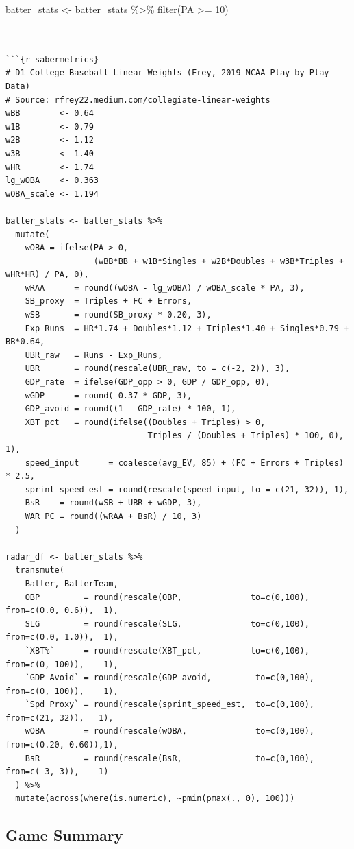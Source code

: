 \documentclass[
]{article}
\begin{document}
batter\_stats \textless- batter\_stats \%\textgreater\% filter(PA
\textgreater= 10)

\begin{verbatim}


```{r sabermetrics}
# D1 College Baseball Linear Weights (Frey, 2019 NCAA Play-by-Play Data)
# Source: rfrey22.medium.com/collegiate-linear-weights
wBB        <- 0.64
w1B        <- 0.79
w2B        <- 1.12
w3B        <- 1.40
wHR        <- 1.74
lg_wOBA    <- 0.363
wOBA_scale <- 1.194

batter_stats <- batter_stats %>%
  mutate(
    wOBA = ifelse(PA > 0,
                  (wBB*BB + w1B*Singles + w2B*Doubles + w3B*Triples + wHR*HR) / PA, 0),
    wRAA      = round((wOBA - lg_wOBA) / wOBA_scale * PA, 3),
    SB_proxy  = Triples + FC + Errors,
    wSB       = round(SB_proxy * 0.20, 3),
    Exp_Runs  = HR*1.74 + Doubles*1.12 + Triples*1.40 + Singles*0.79 + BB*0.64,
    UBR_raw   = Runs - Exp_Runs,
    UBR       = round(rescale(UBR_raw, to = c(-2, 2)), 3),
    GDP_rate  = ifelse(GDP_opp > 0, GDP / GDP_opp, 0),
    wGDP      = round(-0.37 * GDP, 3),
    GDP_avoid = round((1 - GDP_rate) * 100, 1),
    XBT_pct   = round(ifelse((Doubles + Triples) > 0,
                             Triples / (Doubles + Triples) * 100, 0), 1),
    speed_input      = coalesce(avg_EV, 85) + (FC + Errors + Triples) * 2.5,
    sprint_speed_est = round(rescale(speed_input, to = c(21, 32)), 1),
    BsR    = round(wSB + UBR + wGDP, 3),
    WAR_PC = round((wRAA + BsR) / 10, 3)
  )

radar_df <- batter_stats %>%
  transmute(
    Batter, BatterTeam,
    OBP         = round(rescale(OBP,              to=c(0,100), from=c(0.0, 0.6)),  1),
    SLG         = round(rescale(SLG,              to=c(0,100), from=c(0.0, 1.0)),  1),
    `XBT%`      = round(rescale(XBT_pct,          to=c(0,100), from=c(0, 100)),    1),
    `GDP Avoid` = round(rescale(GDP_avoid,         to=c(0,100), from=c(0, 100)),    1),
    `Spd Proxy` = round(rescale(sprint_speed_est,  to=c(0,100), from=c(21, 32)),   1),
    wOBA        = round(rescale(wOBA,              to=c(0,100), from=c(0.20, 0.60)),1),
    BsR         = round(rescale(BsR,               to=c(0,100), from=c(-3, 3)),    1)
  ) %>%
  mutate(across(where(is.numeric), ~pmin(pmax(., 0), 100)))
\end{verbatim}

\subsection{Game Summary}\label{game-summary}
\end{document}
